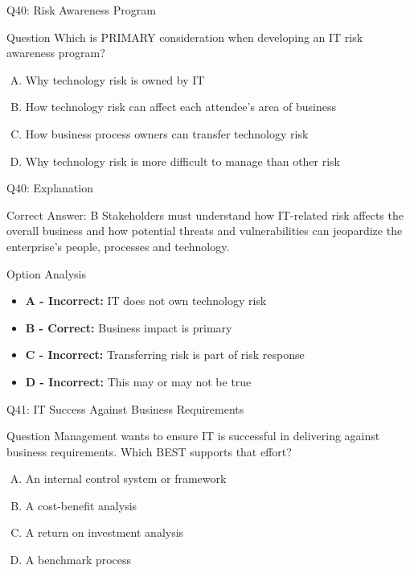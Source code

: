 \documentclass{beamer}
\begin{document}
	\begin{frame}{Q40: Risk Awareness Program}
		\begin{block}{Question}
			Which is PRIMARY consideration when developing an IT risk awareness program?
		\end{block}
		\begin{enumerate}[(A)]
			\item Why technology risk is owned by IT
			\item How technology risk can affect each attendee's area of business
			\item How business process owners can transfer technology risk
			\item Why technology risk is more difficult to manage than other risk
		\end{enumerate}
	\end{frame}
	
	\begin{frame}{Q40: Explanation}
		\begin{block}{Correct Answer: B}
			Stakeholders must understand how IT-related risk affects the overall business and how potential threats and vulnerabilities can jeopardize the enterprise's people, processes and technology.
		\end{block}
		\begin{block}{Option Analysis}
			\begin{itemize}
				\item \textbf{A - Incorrect:} IT does not own technology risk
				\item \textbf{B - Correct:} Business impact is primary
				\item \textbf{C - Incorrect:} Transferring risk is part of risk response
				\item \textbf{D - Incorrect:} This may or may not be true
			\end{itemize}
		\end{block}
	\end{frame}
	
	\begin{frame}{Q41: IT Success Against Business Requirements}
		\begin{block}{Question}
			Management wants to ensure IT is successful in delivering against business requirements. Which BEST supports that effort?
		\end{block}
		\begin{enumerate}[(A)]
			\item An internal control system or framework
			\item A cost-benefit analysis
			\item A return on investment analysis
			\item A benchmark process
		\end{enumerate}
	\end{frame}
	
\end{document}
